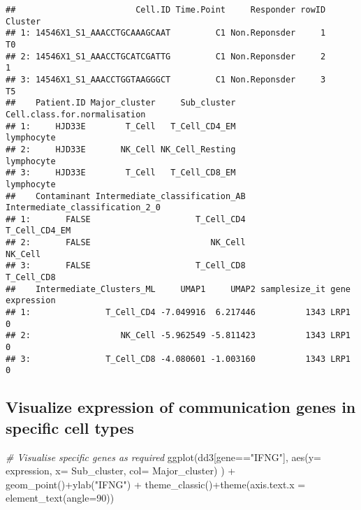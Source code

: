 \documentclass[
]{article}
\newenvironment{Shaded}{\begin{snugshade}}{\end{snugshade}}
\newcommand{\AttributeTok}[1]{\textcolor[rgb]{0.77,0.63,0.00}{#1}}
\newcommand{\CommentTok}[1]{\textcolor[rgb]{0.56,0.35,0.01}{\textit{#1}}}
\newcommand{\DecValTok}[1]{\textcolor[rgb]{0.00,0.00,0.81}{#1}}
\newcommand{\FunctionTok}[1]{\textcolor[rgb]{0.00,0.00,0.00}{#1}}
\newcommand{\NormalTok}[1]{#1}
\newcommand{\SpecialCharTok}[1]{\textcolor[rgb]{0.00,0.00,0.00}{#1}}
\newcommand{\StringTok}[1]{\textcolor[rgb]{0.31,0.60,0.02}{#1}}
\begin{document}
\begin{verbatim}
##                        Cell.ID Time.Point     Responder rowID Cluster
## 1: 14546X1_S1_AAACCTGCAAAGCAAT         C1 Non.Reponsder     1      T0
## 2: 14546X1_S1_AAACCTGCATCGATTG         C1 Non.Reponsder     2       1
## 3: 14546X1_S1_AAACCTGGTAAGGGCT         C1 Non.Reponsder     3      T5
##    Patient.ID Major_cluster     Sub_cluster Cell.class.for.normalisation
## 1:     HJD33E        T_Cell   T_Cell_CD4_EM                   lymphocyte
## 2:     HJD33E       NK_Cell NK_Cell_Resting                   lymphocyte
## 3:     HJD33E        T_Cell   T_Cell_CD8_EM                   lymphocyte
##    Contaminant Intermediate_classification_AB Intermediate_classification_2_0
## 1:       FALSE                     T_Cell_CD4                   T_Cell_CD4_EM
## 2:       FALSE                        NK_Cell                         NK_Cell
## 3:       FALSE                     T_Cell_CD8                      T_Cell_CD8
##    Intermediate_Clusters_ML     UMAP1     UMAP2 samplesize_it gene expression
## 1:               T_Cell_CD4 -7.049916  6.217446          1343 LRP1          0
## 2:                  NK_Cell -5.962549 -5.811423          1343 LRP1          0
## 3:               T_Cell_CD8 -4.080601 -1.003160          1343 LRP1          0
\end{verbatim}

\hypertarget{visualize-expression-of-communication-genes-in-specific-cell-types}{%
\subsection{Visualize expression of communication genes in specific cell
types}\label{visualize-expression-of-communication-genes-in-specific-cell-types}}

\begin{Shaded}
\begin{Highlighting}[]
\CommentTok{\# Visualise specific genes as required}
\FunctionTok{ggplot}\NormalTok{(dd3[gene}\SpecialCharTok{==}\StringTok{"IFNG"}\NormalTok{], }\FunctionTok{aes}\NormalTok{(}\AttributeTok{y=}\NormalTok{ expression, }\AttributeTok{x=}\NormalTok{ Sub\_cluster, }\AttributeTok{col=}\NormalTok{ Major\_cluster) ) }\SpecialCharTok{+} \FunctionTok{geom\_point}\NormalTok{()}\SpecialCharTok{+}\FunctionTok{ylab}\NormalTok{(}\StringTok{"IFNG"}\NormalTok{) }\SpecialCharTok{+} \FunctionTok{theme\_classic}\NormalTok{()}\SpecialCharTok{+}\FunctionTok{theme}\NormalTok{(}\AttributeTok{axis.text.x =} \FunctionTok{element\_text}\NormalTok{(}\AttributeTok{angle=}\DecValTok{90}\NormalTok{))}
\end{Highlighting}
\end{Shaded}
\end{document}
